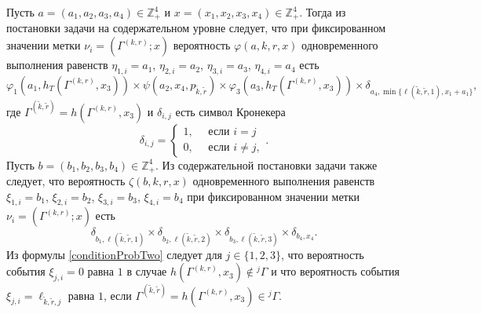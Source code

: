 \documentclass[a4paper,12pt,russian]{extarticle}
\newcommand{\ga}[1]{\Gamma^{\left( #1 \right)} }
\begin{document}
Пусть $a=(a_1, a_2, a_3, a_4) \in \mathbb{Z}_+^4$ и $x=(x_1, x_2, x_3, x_4) \in \mathbb{Z}_+^4$. Тогда из постановки задачи на содержательном уровне следует, что при фиксированном значении метки $\nu_i=(\ga{k,r}; x)$ вероятность $\varphi(a,k,r,x)$ одновременного выполнения равенств $\eta_{1,i}=a_1$, $\eta_{2,i}=a_2$, $\eta_{3,i}=a_3$, $\eta_{4,i}=a_4$ есть 
\begin{equation}
\varphi_1(a_1,h_T(\ga{{k},{r}},x_3)) \times \psi(a_2,x_4, p_{\tilde{k},\tilde{r}}) \times \varphi_3(a_3,h_T(\ga{{k},{r}},x_3))
\times \delta_{a_4,\min{\{\ell(\tilde{k},\tilde{r},1), x_1+a_1}\}},
\label{conditionProbOne}
\end{equation}
где $\ga{\tilde{k},\tilde{r}}=h(\ga{k,r},x_3)$ и $\delta_{i,j}$ есть символ Кронекера
\begin{equation*}
\delta_{i,j}=\begin{cases} 1, \quad \text{ если }i=j\\0, \quad \text{ если } i\neq j,
\end{cases}.
\end{equation*}
Пусть $b=(b_1, b_2, b_3, b_4) \in \mathbb{Z}_+^4$. Из содержательной постановки задачи также следует, что вероятность $\zeta(b, k, r, x)$ одновременного выполнения равенств $\xi_{1,i}=b_1$, $\xi_{2,i}=b_2$, $\xi_{3,i}=b_3$, $\xi_{4,i}=b_4$ при фиксированном значении метки $\nu_i=(\ga{k,r}; x)$ есть
\begin{equation}
\delta_{b_1,\ell(\tilde{k},\tilde{r},1)} \times \delta_{b_2,\ell(\tilde{k},\tilde{r},2)} \times 
\delta_{b_3,\ell(\tilde{k},\tilde{r},3)} \times \delta_{b_4,x_4}.
\label{conditionProbTwo}
\end{equation}
Из формулы \eqref{conditionProbTwo} следует для $j\in \{1, 2, 3\}$, что вероятность события $\xi_{j,i}=0$ равна $1$ в случае $h(\ga{k,r},x_3)\notin {}^j\Gamma$ и что вероятность события $\xi_{j,i}=\ell_{\tilde{k},\tilde{r},j}$ равна $1$, если $\ga{\tilde{k},\tilde{r}}=h(\ga{k,r},x_3)\in {}^j\Gamma$.
\end{document}
